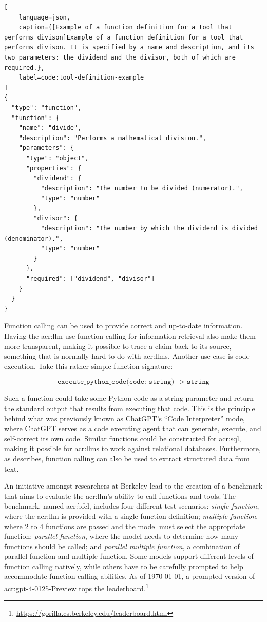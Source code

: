 \begin{lstlisting}[
    language=json,
    caption={[Example of a function definition for a tool that performs divison]Example of a function definition for a tool that performs divison. It is specified by a name and description, and its two parameters: the dividend and the divisor, both of which are required.},
    label=code:tool-definition-example
]
{
  "type": "function",
  "function": {
    "name": "divide",
    "description": "Performs a mathematical division.",
    "parameters": {
      "type": "object",
      "properties": {
        "dividend": {
          "description": "The number to be divided (numerator).",
          "type": "number"
        },
        "divisor": {
          "description": "The number by which the dividend is divided (denominator).",
          "type": "number"
        }
      },
      "required": ["dividend", "divisor"]
    }
  }
}
\end{lstlisting}

Function calling can be used to provide correct and up-to-date information. Having the \gls{acr:llm} use function calling for information retrieval also make them more transparent, making it possible to trace a claim back to its source, something that is normally hard to do with \glspl{acr:llm}. Another use case is code execution. Take this rather simple function signature:

$$
    \texttt{execute\_python\_code(code: string) -> string}
$$

Such a function could take some Python code as a string parameter and return the standard output that results from executing that code. This is the principle behind what was previously known as ChatGPT's \enquote{Code Interpreter} mode, where ChatGPT serves as a code executing agent that can generate, execute, and self-correct its own code. Similar functions could be constructed for \acrshort{acr:sql}, making it possible for \glspl{acr:llm} to work against relational databases. Furthermore, as \cite{eletiFunctionCallingOther2023} describes, function calling can also be used to extract structured data from text.

An initiative amongst researchers at Berkeley \citep{yanfanjiaBerkeleyFunctionCalling2024} lead to the creation of a benchmark that aims to evaluate the \acrshort{acr:llm}'s ability to call functions and tools. The benchmark, named \gls{acr:bfcl}, includes four different test scenarios: \textit{single function}, where the \acrshort{acr:llm} is provided with a single function definition; \textit{multiple function}, where 2 to 4 functions are passed and the model must select the appropriate function; \textit{parallel function}, where the model needs to determine how many functions should be called; and \textit{parallel multiple function}, a combination of parallel function and multiple function. Some models support different levels of function calling natively, while others have to be carefully prompted to help accommodate function calling abilities. As of \today, a prompted version of \acrshort{acr:gpt}-4-0125-Preview tops the leaderboard.\footnote{\url{https://gorilla.cs.berkeley.edu/leaderboard.html}}

